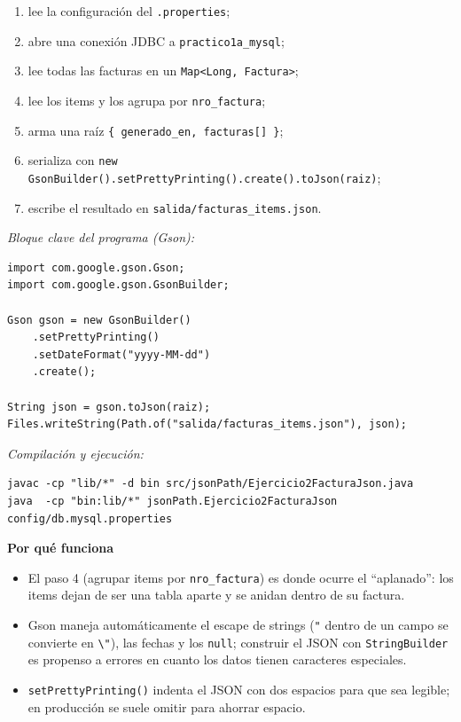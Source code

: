 \documentclass[11pt,a4paper]{article}
\newcommand{\itemcabecera}[1]{\noindent\textbf{#1}\par\medskip}
\newcommand{\bloquePorque}{\itemcabecera{Por qu\'e funciona}}
\begin{document}
\begin{enumerate}
    \item lee la configuración del \texttt{.properties};
    \item abre una conexión JDBC a \texttt{practico1a\_mysql};
    \item lee todas las facturas en un \texttt{Map<Long, Factura>};
    \item lee los items y los agrupa por \texttt{nro\_factura};
    \item arma una raíz \texttt{\{ generado\_en, facturas[] \}};
    \item serializa con \texttt{new GsonBuilder().setPrettyPrinting().create().toJson(raiz)};
    \item escribe el resultado en \texttt{salida/facturas\_items.json}.
\end{enumerate}

\textit{Bloque clave del programa (Gson):}

\begin{lstlisting}[style=javastyle]
import com.google.gson.Gson;
import com.google.gson.GsonBuilder;

Gson gson = new GsonBuilder()
    .setPrettyPrinting()
    .setDateFormat("yyyy-MM-dd")
    .create();

String json = gson.toJson(raiz);
Files.writeString(Path.of("salida/facturas_items.json"), json);
\end{lstlisting}

\textit{Compilación y ejecución:}

\begin{lstlisting}[style=plain]
javac -cp "lib/*" -d bin src/jsonPath/Ejercicio2FacturaJson.java
java  -cp "bin:lib/*" jsonPath.Ejercicio2FacturaJson config/db.mysql.properties
\end{lstlisting}

\bloquePorque

\begin{itemize}
    \item El paso 4 (agrupar items por \texttt{nro\_factura}) es donde ocurre el ``aplanado'': los items dejan de ser una tabla aparte y se anidan dentro de su factura.
    \item Gson maneja automáticamente el escape de strings (\texttt{"} dentro de un campo se convierte en \texttt{\textbackslash"}), las fechas y los \texttt{null}; construir el JSON con \texttt{StringBuilder} es propenso a errores en cuanto los datos tienen caracteres especiales.
    \item \texttt{setPrettyPrinting()} indenta el JSON con dos espacios para que sea legible; en producción se suele omitir para ahorrar espacio.
\end{itemize}
\end{document}
